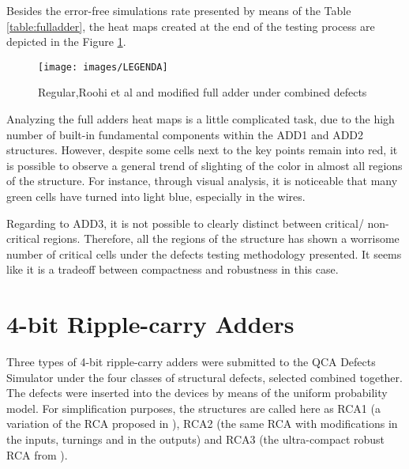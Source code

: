 Besides the error-free simulations rate presented by means of the Table \ref{table:fulladder}, the heat maps created at the end of the testing process are depicted in the Figure \ref{figure:full_t1}.

\begin{figure}[H]
\center
{}
\hfill
{}
\hfill
{}
\linebreak
{\texttt{[image: images/LEGENDA]}
}
\caption{Regular,Roohi et al and modified full adder under combined defects}
\label{figure:full_t1}
\end{figure}

Analyzing the full adders heat maps is a little complicated task, due to the high number of built-in fundamental components within the ADD1 and ADD2 structures. However, despite some cells next to the key points remain into red, it is possible to observe a general trend of slighting of the color in almost all regions of the structure. For instance, through visual analysis, it is noticeable that many green cells have turned into light blue, especially in the wires.

Regarding to ADD3, it is not possible to clearly distinct between critical/ non-critical regions. Therefore, all the regions of the structure has shown a worrisome number of critical cells under the defects testing methodology presented. It seems like it is a tradeoff between compactness and robustness in this case.

\section{4-bit Ripple-carry Adders}

Three types of 4-bit ripple-carry adders were submitted to the QCA Defects Simulator under the four classes of structural defects, selected combined together. The defects were inserted into the devices by means of the uniform probability model. 
For simplification purposes, the structures are called here as RCA1 (a variation of the RCA proposed in \cite{bruschi11}), RCA2 (the same  RCA with modifications in the inputs, turnings and in the outputs) and RCA3 (the ultra-compact robust RCA from \cite{roohi15}).

